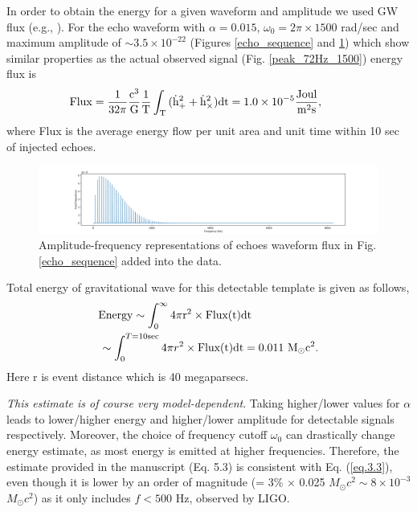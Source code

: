 \documentclass[12pt]{article}
\begin{document}
In order to obtain the energy for a given waveform and amplitude we used GW flux (e.g., \cite{Hobson,GravitationalWavePhysics}). For the echo waveform with $\alpha=0.015$, $\omega_{0}=2\pi\times 1500$ rad/sec and maximum amplitude of $\sim 3.5\times 10^{-22}$  (Figures \ref{echo_sequence} and \ref{Flux}) which show similar properties as the actual observed signal (Fig. \ref{peak_72Hz_1500}) energy flux is
\begin{eqnarray}
\!\!\!\!\!\!\!\!\!\!\!\!\!\!\rm{Flux}=\frac{1}{32\pi} \frac{c^{3}}{G} \frac{1}{T} \int_{T}{(\dot{h}_{+}^{2} + \dot{h}_{\times}^{2}})dt=1.0 \times 10^{-5} \frac{\rm{Joul}}{\rm{m}^{2}\rm{s}} \label{eq.3.2}, \nonumber \\
\end{eqnarray}
where Flux is the average energy flow per unit area and unit time within 10 sec of injected echoes. 
\begin{figure}[t]
    \includegraphics[width=1\textwidth]{Flux_in_frequency01.pdf}
 \caption{Amplitude-frequency representations of echoes waveform flux in Fig. \ref{echo_sequence} added into the data.}
 \label{Flux}
\end{figure}

Total energy of gravitational wave for this detectable template is given as follows,
\begin{eqnarray}
\rm{Energy} \sim \int_{0}^{\infty} 4\pi r^{2} \times \rm{Flux(t)} dt \ \ \ \ \ \ \ \ \ \ \ \ \ \ \ \ \ \ \nonumber \\
\!\!\!\!\! \sim \int_{0}^{T=10 \rm{sec}} 4\pi r^{2} \times \rm{Flux(t)} dt =0.011 ~M_{\odot}c^2. \label{eq.3.3}
\end{eqnarray}
Here r is event distance which is 40 megaparsecs. 

{\it This estimate is of course very model-dependent}. Taking higher/lower values for $\alpha$ leads to lower/higher energy and higher/lower amplitude for detectable signals respectively. Moreover, the choice of frequency cutoff $\omega_0$ can drastically change energy estimate, as most energy is emitted at higher frequencies. Therefore, the estimate provided in the manuscript (Eq. 5.3)  is consistent with Eq. (\ref{eq.3.3}), even though it is lower by an order of magnitude (= 3\% $\times$ 0.025 $M_{\odot}c^2 \sim 8 \times 10^{-3}$  $M_{\odot}c^2$) as it only includes $f < 500$ Hz, observed by LIGO. 
\end{document}
